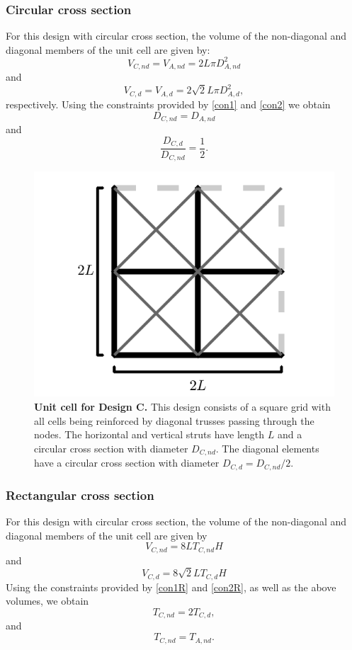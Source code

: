 \documentclass[10pt,twoside]{fernandes_supp}
\begin{document}
\subsubsection{Circular cross section}
For this design with circular cross section, the volume of the non-diagonal and diagonal members  of the unit cell are given by:
\begin{equation}
V_{C,nd}=V_{A,nd}=2 L \pi D^2_{A,nd}
\end{equation}
and
\begin{equation}
V_{C,d}=V_{A,d}=2\sqrt{2}L \pi D^2_{A,d},
\end{equation}
respectively.
Using the constraints provided by \cref{con1} and \cref{con2} we  obtain 
\begin{equation}
{{D}_{C,nd}}={{D}_{A,nd}}
\end{equation}
and
\begin{equation}
\frac{{D}_{C,d}}{{D}_{C,nd}}=\frac{1}{2}.
\end{equation}

\begin{figure}[H]
    \centering
    \includegraphics[width=0.4\linewidth]{SFig4.png}
    \caption{{\bf Unit cell for Design C.} This design consists of a square grid with all cells being reinforced by diagonal trusses passing through the nodes.  The horizontal and vertical struts have length $L$ and a circular cross section with diameter $D_{C,nd}$. The diagonal elements have a circular cross section  with diameter $D_{C,d}={D_{C,nd}}/{2}$.}
    \label{DesignC}
\end{figure}

\subsubsection{Rectangular cross section}
For this design with circular cross section, the volume of the non-diagonal and diagonal members  of the unit cell are given by
\begin{equation}
V_{C,nd}=8LT_{C,nd}H
\end{equation}
and
\begin{equation}
V_{C,d}=8\sqrt{2}LT_{C,d}H
\end{equation}
Using the constraints provided by \cref{con1R} and \cref{con2R}, as well as the above volumes, we  obtain
\begin{equation}
T_{C,nd}=2T_{C,d},
\end{equation}
and
\begin{equation}
T_{C,nd}=T_{A,nd}.
\end{equation}
\end{document}
